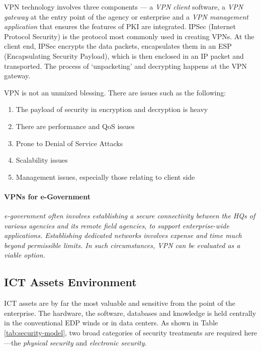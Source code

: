 VPN technology involves three components — a \textit{VPN client} software, a \textit{VPN gateway}
at the entry point of the agency or enterprise and a \textit{VPN management application} that
ensures the features of PKI are integrated. IPSec (Internet Protocol Security) is the protocol most commonly used in creating VPNs. At the client end, IPSec encrypts the data packets,
encapsulates them in an ESP (Encapsulating Security Payload), which is then enclosed in
an IP packet and transported. The process of ‘unpacketing’ and decrypting happens at the VPN gateway.

VPN is not an unmixed blessing. There are issues such as the following:

\begin{enumerate}
	\item The payload of security in encryption and decryption is heavy
	
	\item There are performance and QoS issues
	
	\item Prone to Denial of Service Attacks
	
	\item Scalability issues
	
	\item Management issues, especially those relating to client side
\end{enumerate}

\paragraph*{VPNs for e-Government}
\emph{e-government often involves establishing a secure connectivity between the HQs of various agencies and its remote field agencies, to support enterprise-wide applications. Establishing dedicated networks involves expense and time much beyond permissible limits. In such circumstances, VPN can be evaluated as a viable option.}

 \subsection{ICT Assets Environment}
 ICT assets are by far the most valuable and sensitive from the point of the enterprise. The hardware, the software, databases and knowledge is held centrally in the conventional EDP winds or in data centers. As shown in Table {\ref{tab:security-model}}, two broad categories of security treatments
 are required here—the \textit{physical security} and \textit{electronic security}.
 
